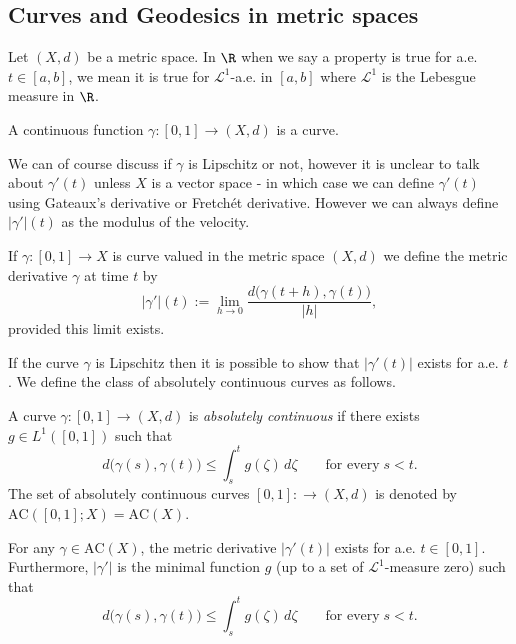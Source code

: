 \subsection{Curves and Geodesics in metric spaces}
Let $(X, d)$ be a metric space. In $\R$ when we say a property is true for a.e. $t\in [a,b]$, we mean it is true for $\mathcal{L}^1$-a.e. in $[a,b]$ where $\mathcal{L}^1$ is the Lebesgue measure in $\R$.

\begin{defn} A continuous function $\gamma:[0,1]\to (X,d)$ is a curve.
\end{defn}
We can of course discuss if $\gamma$ is Lipschitz or not, however it is unclear to talk about $\gamma'(t)$ unless $X$ is a vector space - in which case we can define $\gamma'(t)$ using Gateaux's derivative or Fretch\'et derivative. However we can always define $|\gamma'|(t)$ as the modulus of the velocity.

\begin{defn} If $\gamma:[0,1]\to X$ is curve valued in the metric space $(X,d)$ we define the metric derivative $\gamma$ at time $t$ by
\begin{equation*}
    |\gamma'|(t) := \lim_{h\to 0} \frac{d\big(\gamma(t+h), \gamma(t)\big)}{|h|},
\end{equation*}
provided this limit exists. 
\end{defn}

If the curve $\gamma$ is Lipschitz then it is possible to show that $|\gamma'(t)|$ exists for a.e. $t$. We define the class of absolutely continuous curves as follows.

\begin{defn} A curve $\gamma:[0,1]\to (X,d)$ is \emph{absolutely continuous} if there exists $g\in L^1([0,1])$ such that 
\begin{equation*}
    d\big(\gamma(s), \gamma(t)\big) \leq \int_s^t g(\zeta)\,d\zeta \qquad 
    \text{for every}\;s<t.
\end{equation*}
The set of absolutely continuous curves $[0,1]:\to (X,d)$ is denoted by $\mathrm{AC}([0,1];X)=\mathrm{AC}(X)$.
\end{defn}


\begin{thm} For any $\gamma\in \mathrm{AC}(X)$, the metric derivative $|\gamma'(t)|$ exists for a.e. $t\in [0,1]$. Furthermore, $|\gamma'|$ is the minimal function $g$ (up to a set of $\mathcal{L}^1$-measure zero) such that 
\begin{equation*}
    d\big(\gamma(s), \gamma(t)\big) \leq \int_s^t g(\zeta)\,d\zeta \qquad 
    \text{for every}\;s<t.
\end{equation*}
\end{thm}


